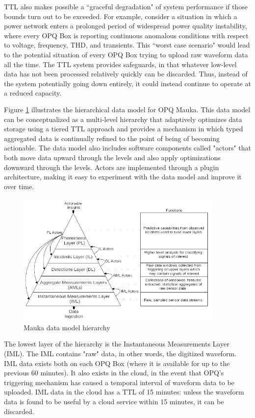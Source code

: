 TTL also makes possible a ``graceful degradation" of system performance if those bounds turn out to be exceeded. For example, consider a situation in which a power network enters a prolonged period of widespread power quality instability, where every OPQ Box is reporting continuous anomalous conditions with respect to voltage, frequency, THD, and transients.  This ``worst case scenario" would lead to the potential situation of every OPQ Box trying to upload raw waveform data all the time. The TTL system provides safeguards, in that whatever low-level data has not been processed relatively quickly can be discarded.  Thus, instead of the system potentially going down entirely, it could instead continue to operate at a reduced capacity.

Figure \ref{fig:mauka-data-model} illustrates the hierarchical data model for OPQ Mauka. This data model can be conceptualized as a multi-level hierarchy that adaptively optimizes data storage using a tiered TTL approach and provides a mechanism in which typed aggregated data is continually refined to the point of being of becoming actionable. The data model also includes software components called "actors" that both move data upward through the levels and also apply optimizations downward through the levels. Actors are implemented through a plugin architecture, making it easy to experiment with the data model and improve it over time.

\begin{figure}
\center \includegraphics[width=4in]{images/mauka/mauka-data-model.png}
\caption{Mauka data model hierarchy}
\label{fig:mauka-data-model}
\end{figure}

The lowest layer of the hierarchy is the Instantaneous Measurements Layer (IML). The IML contains "raw" data, in other words, the digitized waveform.  IML data exists both on each OPQ Box (where it is available for up to the previous 60 minutes). It also exists in the cloud, in the event that OPQ's triggering mechanism has caused a temporal interval of waveform data to be uploaded. IML data in the cloud has a TTL of 15 minutes: unless the waveform data is found to be useful by a cloud service within 15 minutes, it can be discarded.

